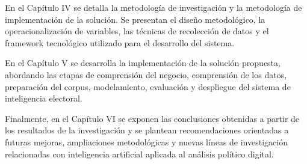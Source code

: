 En el Capítulo IV se detalla la metodología de investigación y la metodología de implementación de la solución. Se presentan el diseño metodológico, la operacionalización de variables, las técnicas de recolección de datos y el framework tecnológico utilizado para el desarrollo del sistema.

En el Capítulo V se desarrolla la implementación de la solución propuesta, abordando las etapas de comprensión del negocio, comprensión de los datos, preparación del corpus, modelamiento, evaluación y despliegue del sistema de inteligencia electoral.

Finalmente, en el Capítulo VI se exponen las conclusiones obtenidas a partir de los resultados de la investigación y se plantean recomendaciones orientadas a futuras mejoras, ampliaciones metodológicas y nuevas líneas de investigación relacionadas con inteligencia artificial aplicada al análisis político digital.